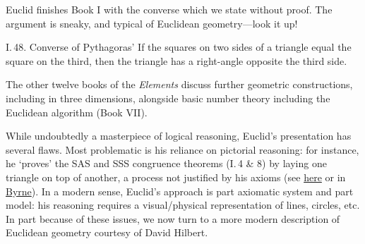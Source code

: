 Euclid finishes Book I with the converse which we state without proof. The argument is sneaky, and typical of Euclidean geometry---look it up!

\begin{cor}{I.\,48. Converse of Pythagoras'}{}
	If the squares on two sides of a triangle equal the square on the third, then the triangle has a right-angle opposite the third side.
\end{cor}

The other twelve books of the \emph{Elements} discuss further geometric constructions, including in three dimensions, alongside basic number theory including the Euclidean algorithm (Book VII).\medbreak

While undoubtedly a masterpiece of logical reasoning, Euclid's presentation has several flaws. Most problematic is his reliance on pictorial reasoning: for instance, he `proves' the SAS and SSS congruence theorems (I.\,4 \& 8) by laying one triangle on top of another, a process not justified by his axioms (see \href{http://math.furman.edu/~jpoole/euclidselements/euclid.htm}{here} or in \href{http://math.uci.edu/~ndonalds/Elements-I-VI.pdf}{Byrne}). In a modern sense, Euclid's approach is part axiomatic system and part model: his reasoning requires a visual/physical representation of lines, circles, etc. In part because of these issues, we now turn to a more modern description of Euclidean geometry courtesy of David Hilbert.




